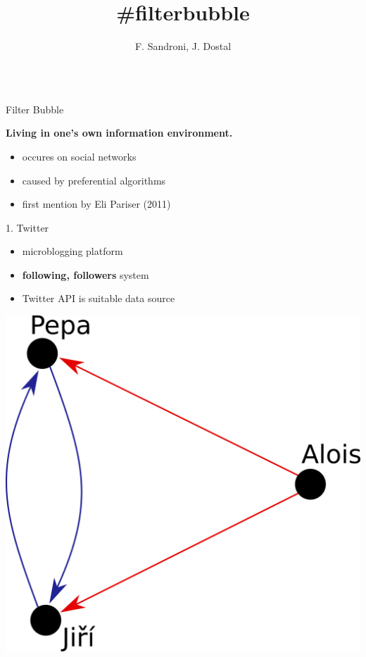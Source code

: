 \documentclass{beamer}
\title{\#filterbubble}
\author[dostal.jakub@outlook.com]{F. Sandroni, J. Dostal}
\begin{document}
\begin{frame}[fragile]
\begin{columns}[T]
\begin{column}{.33\textwidth}
\begin{block}{Filter Bubble}
    \center
    \begin{large}\textbf{Living in one's own information environment.}\end{large}
    \vspace{0.8cm}
    \begin{itemize}
        \item occures on social networks
        \item caused by preferential algorithms
        \item first mention by Eli Pariser (2011)
    \end{itemize}
\end{block}
\begin{blankblock}{1. Twitter}
	\begin{itemize}
		\item microblogging platform
        \item \textbf{following, followers} system
		\item Twitter API is suitable data source
	\end{itemize}
	\center
	\includegraphics[scale=0.55]{./Pics/pepa.png}

\end{blankblock}
\end{column}
\end{columns}
\end{frame}
\end{document}

